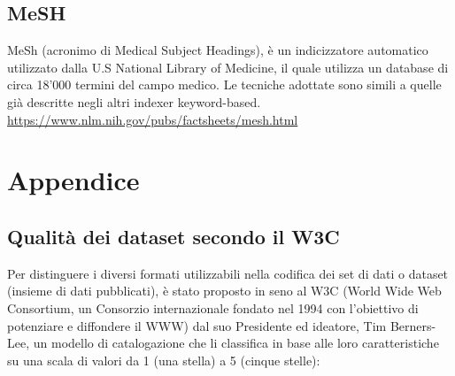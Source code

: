 \documentclass{article}
\theoremstyle{plain}
\theoremstyle{definition}
\begin{document}
\subsection{MeSH}
MeSh (acronimo di Medical Subject Headings), è un indicizzatore automatico utilizzato dalla U.S National Library of Medicine, il quale utilizza un database di circa 18'000 termini del campo medico. Le tecniche adottate sono simili a quelle già descritte negli altri indexer keyword-based.
\url{https://www.nlm.nih.gov/pubs/factsheets/mesh.html}

\newpage
\section{Appendice}

\subsection{Qualità dei dataset secondo il W3C}
Per distinguere i diversi formati utilizzabili nella codifica dei set di dati o dataset (insieme di dati pubblicati), è stato proposto in seno al W3C (World Wide Web Consortium, un Consorzio internazionale fondato nel 1994 con l'obiettivo di potenziare e diffondere il WWW) dal suo Presidente ed ideatore, Tim Berners-Lee, un modello di catalogazione che li classifica in base alle loro caratteristiche su una scala di valori da 1 (una stella) a 5 (cinque stelle):
\\
\end{document}
